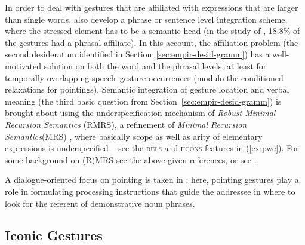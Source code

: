 \documentclass[output=paper,biblatex,babelshorthands,newtxmath,draftmode,colorlinks,citecolor=brown]{langscibook}
\begin{document}
In order to deal with gestures that are affiliated with expressions that are larger than single words, \citet{Alahverdzhieva:Lascarides:Flickinger:2017} also develop a phrase or sentence level integration scheme, where the stressed element has to be a semantic head (in the study of \citealt{Mehler:Luecking:2012:d}, 18.8\% of the gestures had a phrasal affiliate).
%
In this account, the affiliation problem (the second desideratum identified in Section~\ref{sec:empir-desid-gramm}) has a well-motivated solution on both the word and the phrasal levels, at least for temporally overlapping speech--gesture occurrences (modulo the conditioned relaxations for pointings).
%
Semantic integration of gesture location and verbal meaning (the third basic question from Section~\ref{sec:empir-desid-gramm}) is brought about using the underspecification mechanism of \emph{Robust Minimal Recursion Semantics} (RMRS), a refinement of \emph{Minimal Recursion Semantics}\indexmrs (MRS) \citep{Copestake:Flickinger:Pollard:Sag:2005}, where basically scope as well as arity of elementary expressions is underspecified \citep{Copestake:2007} -- see the \textsc{rels} and \textsc{hcons} features in (\ref{ex:pwc}).
%
For some background on (R)MRS see the above given references, or see . %


A dialogue-oriented focus on pointing is taken in \citet{Luecking:2018:a}: here, pointing gestures play a role in formulating processing instructions that guide the addressee in where to look for the referent of demonstrative noun phrases. %



\subsection{Iconic Gestures}
\label{sec:iconic-gestures}
\end{document}
